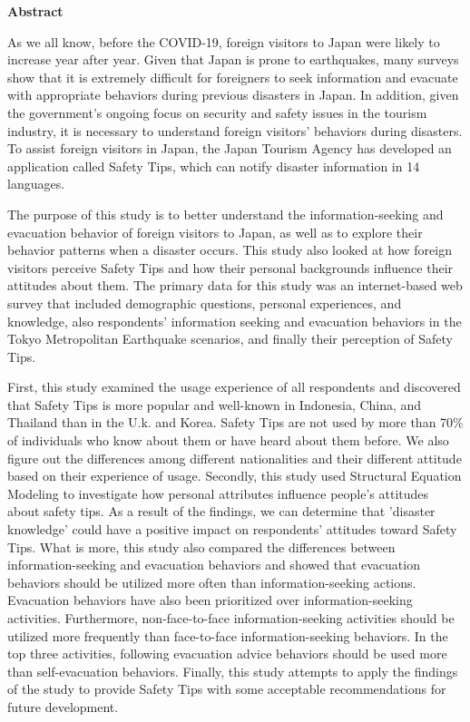 
\begin{center}\textbf{Abstract}\end{center}

As we all know, before the COVID-19, foreign visitors to Japan were likely to increase year after year. Given that Japan is prone to earthquakes, many surveys show that it is extremely difficult for foreigners to seek information and evacuate with appropriate behaviors during previous disasters in Japan. In addition, given the government's ongoing focus on security and safety issues in the tourism industry, it is necessary to understand foreign visitors' behaviors during disasters. To assist foreign visitors in Japan, the Japan Tourism Agency has developed an application called Safety Tips, which can notify disaster information in 14 languages.

The purpose of this study is to better understand the information-seeking and evacuation behavior of foreign visitors to Japan, as well as to explore their behavior patterns when a disaster occurs. This study also looked at how foreign visitors perceive Safety Tips and how their personal backgrounds influence their attitudes about them. The primary data for this study was an internet-based web survey that included demographic questions, personal experiences, and knowledge, also respondents’ information seeking and evacuation behaviors in the Tokyo Metropolitan Earthquake scenarios, and finally their perception of Safety Tips. 

First, this study examined the usage experience of all respondents and discovered that Safety Tips is more popular and well-known in Indonesia, China, and Thailand than in the U.k. and Korea. Safety Tips are not used by more than 70\% of individuals who know about them or have heard about them before. We also figure out the differences among different nationalities and their different attitude based on their experience of usage. Secondly, this study used Structural Equation Modeling to investigate how personal attributes influence people's attitudes about safety tips. As a result of the findings, we can determine that 'disaster knowledge' could have a positive impact on respondents' attitudes toward Safety Tips. What is more, this study also compared the differences between information-seeking and evacuation behaviors and showed that evacuation behaviors should be utilized more often than information-seeking actions. Evacuation behaviors have also been prioritized over information-seeking activities. Furthermore, non-face-to-face information-seeking activities should be utilized more frequently than face-to-face information-seeking behaviors. In the top three activities, following evacuation advice behaviors should be used more than self-evacuation behaviors. Finally, this study attempts to apply the findings of the study to provide Safety Tips with some acceptable recommendations for future development. 

\cleardoublepage

